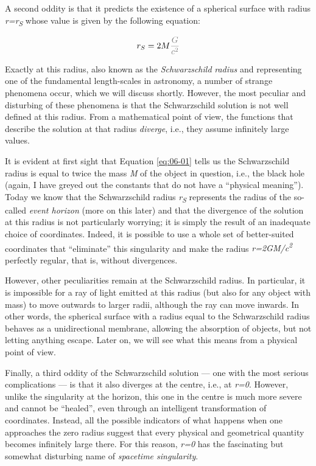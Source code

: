 A second oddity is that it predicts the existence of a spherical surface with radius
\emph{r=r\textsubscript{S}} whose value is given by the following equation:

\begin{equation}\label{eq:06-01}
r_{S}=2M\textcolor{gray}{\frac{G}{c^{2}}}
\end{equation}

Exactly at this radius, also known as the \emph{Schwarzschild}
\emph{radius} and representing one of the fundamental length-scales in astronomy, a
number of strange phenomena occur, which we will discuss shortly. However, the most
peculiar and disturbing of these phenomena is that the Schwarzschild solution is not
well defined at this radius. From a mathematical point of view, the functions that
describe the solution at that radius \emph{diverge}, i.e., they assume infinitely large
values.

It is evident at first sight that Equation \eqref{eq:06-01} tells us the Schwarzschild radius is
equal to twice the mass \emph{M} of the object in question, i.e., the black hole (again,
I have greyed out the constants that do not have a ``physical meaning''). Today we know
that the Schwarzschild radius \emph{r\textsubscript{S}} represents the radius of the
so-called \emph{event horizon} (more on this later) and that the
divergence of the solution at this radius is not particularly worrying; it is simply the
result of an inadequate choice of coordinates. Indeed, it is possible
to use a whole set of better-suited coordinates that ``eliminate'' this
singularity and make the radius \emph{r=2GM/c\textsuperscript{2}}
perfectly regular, that is, without divergences.

However, other peculiarities remain at the Schwarzschild radius. In particular, it is
impossible for a ray of light emitted at this radius (but also for any object with mass)
to move outwards to larger radii, although the ray can move inwards. In other words, the
spherical surface with a radius equal to the Schwarzschild radius behaves as a
unidirectional membrane, allowing the absorption of objects, but not letting anything
escape. Later on, we will see what this means from a physical point of view.

Finally, a third oddity of the Schwarzschild solution --- one with the most serious
complications --- is that it also diverges at the centre, i.e., at \emph{r=0}. However,
unlike the singularity at the horizon, this one in the centre is much more severe and
cannot be ``healed'', even through an intelligent transformation of
coordinates. Instead, all the possible indicators of what happens when
one approaches the zero radius suggest that every physical and geometrical quantity
becomes infinitely large there. For this reason, \emph{r=0} has the fascinating but
somewhat disturbing name of \emph{spacetime singularity}.

